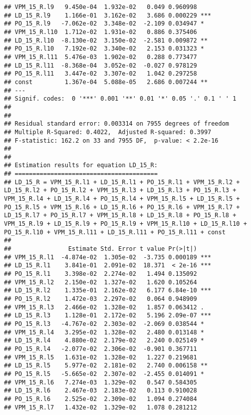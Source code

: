 \documentclass[
]{article}
\begin{document}
\begin{verbatim}
## VPM_15_R.l9   9.450e-04  1.932e-02   0.049 0.960998    
## LD_15_R.l9    1.166e-01  3.162e-02   3.686 0.000229 ***
## PO_15_R.l9   -7.062e-02  3.348e-02  -2.109 0.034947 *  
## VPM_15_R.l10  1.712e-02  1.931e-02   0.886 0.375406    
## LD_15_R.l10  -8.130e-02  3.150e-02  -2.581 0.009872 ** 
## PO_15_R.l10   7.192e-02  3.340e-02   2.153 0.031323 *  
## VPM_15_R.l11  5.476e-03  1.902e-02   0.288 0.773477    
## LD_15_R.l11  -8.368e-04  3.052e-02  -0.027 0.978129    
## PO_15_R.l11   3.447e-02  3.307e-02   1.042 0.297258    
## const         1.367e-04  5.088e-05   2.686 0.007244 ** 
## ---
## Signif. codes:  0 '***' 0.001 '**' 0.01 '*' 0.05 '.' 0.1 ' ' 1
## 
## 
## Residual standard error: 0.003314 on 7955 degrees of freedom
## Multiple R-Squared: 0.4022,  Adjusted R-squared: 0.3997 
## F-statistic: 162.2 on 33 and 7955 DF,  p-value: < 2.2e-16 
## 
## 
## Estimation results for equation LD_15_R: 
## ======================================== 
## LD_15_R = VPM_15_R.l1 + LD_15_R.l1 + PO_15_R.l1 + VPM_15_R.l2 + LD_15_R.l2 + PO_15_R.l2 + VPM_15_R.l3 + LD_15_R.l3 + PO_15_R.l3 + VPM_15_R.l4 + LD_15_R.l4 + PO_15_R.l4 + VPM_15_R.l5 + LD_15_R.l5 + PO_15_R.l5 + VPM_15_R.l6 + LD_15_R.l6 + PO_15_R.l6 + VPM_15_R.l7 + LD_15_R.l7 + PO_15_R.l7 + VPM_15_R.l8 + LD_15_R.l8 + PO_15_R.l8 + VPM_15_R.l9 + LD_15_R.l9 + PO_15_R.l9 + VPM_15_R.l10 + LD_15_R.l10 + PO_15_R.l10 + VPM_15_R.l11 + LD_15_R.l11 + PO_15_R.l11 + const 
## 
##                Estimate Std. Error t value Pr(>|t|)    
## VPM_15_R.l1  -4.874e-02  1.305e-02  -3.735 0.000189 ***
## LD_15_R.l1    3.841e-01  2.091e-02  18.371  < 2e-16 ***
## PO_15_R.l1    3.398e-02  2.274e-02   1.494 0.135092    
## VPM_15_R.l2   2.150e-02  1.327e-02   1.620 0.105264    
## LD_15_R.l2    1.335e-01  2.162e-02   6.177 6.84e-10 ***
## PO_15_R.l2    1.472e-03  2.297e-02   0.064 0.948909    
## VPM_15_R.l3   2.466e-02  1.328e-02   1.857 0.063412 .  
## LD_15_R.l3    1.128e-01  2.172e-02   5.196 2.09e-07 ***
## PO_15_R.l3   -4.767e-02  2.303e-02  -2.069 0.038544 *  
## VPM_15_R.l4   3.295e-02  1.328e-02   2.480 0.013148 *  
## LD_15_R.l4    4.880e-02  2.179e-02   2.240 0.025149 *  
## PO_15_R.l4   -2.077e-02  2.306e-02  -0.901 0.367711    
## VPM_15_R.l5   1.631e-02  1.328e-02   1.227 0.219681    
## LD_15_R.l5    5.977e-02  2.181e-02   2.740 0.006158 ** 
## PO_15_R.l5   -5.665e-02  2.307e-02  -2.455 0.014091 *  
## VPM_15_R.l6   7.274e-03  1.329e-02   0.547 0.584305    
## LD_15_R.l6    2.467e-03  2.183e-02   0.113 0.910028    
## PO_15_R.l6    2.525e-02  2.309e-02   1.094 0.274084    
## VPM_15_R.l7   1.432e-02  1.329e-02   1.078 0.281212    

\end{verbatim}
\end{document}

